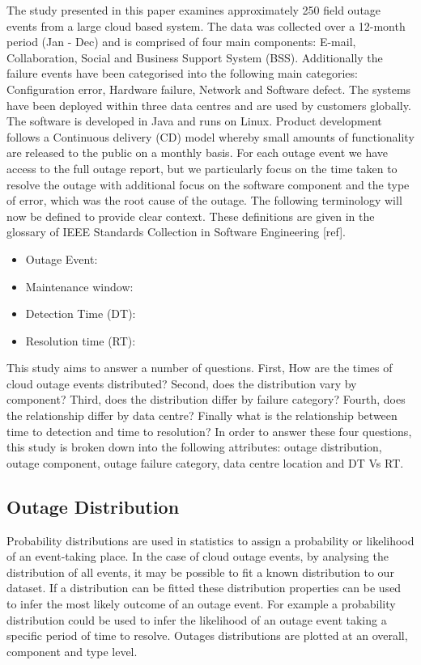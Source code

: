 \documentclass[conference]{IEEEtran}
\begin{document}
The study presented in this paper examines approximately 250 field outage events from a large cloud based system. The data was collected over a 12-month period (Jan - Dec) and is comprised of four main components: E-mail, Collaboration, Social and Business Support System (BSS). Additionally the failure events have been categorised into the following main categories: Configuration error, Hardware failure, Network and Software defect. The systems have been deployed within three data centres and are used by customers globally. The software is developed in Java and runs on Linux. Product development follows a Continuous delivery (CD) model whereby small amounts of functionality are released to the public on a monthly basis. For each outage event we have access to the full outage report, but we particularly focus on the time taken to resolve the outage with additional focus on the software component and the type of error, which was the root cause of the outage. The following terminology will now be defined to provide clear context. These definitions are given in the glossary of IEEE Standards Collection in Software Engineering [ref]. \par


\begin{itemize}
 \item Outage Event: 
 \item  Maintenance window: 
 \item Detection Time (DT):
\item Resolution time (RT):
\end{itemize}

This study aims to answer a number of questions. First, How are the times of cloud outage events distributed? Second, does the distribution vary by component? Third, does the distribution differ by failure category? Fourth, does the relationship differ by data centre? Finally what is the relationship between time to detection and time to resolution? In order to answer these four questions, this study is broken down into the following attributes: outage distribution, outage component, outage failure category, data centre location and DT Vs RT. \par


\subsection{Outage Distribution}

Probability distributions are used in statistics to assign a probability or likelihood of an event-taking place. In the case of cloud outage events, by analysing the distribution of all events, it may be possible to fit a known distribution to our dataset. If a distribution can be fitted these distribution properties can be used to infer the most likely outcome of an outage event. For example a probability distribution could be used to infer the likelihood of an outage event taking a specific period of time to resolve. Outages distributions are plotted at an overall, component and type level.
\end{document}
